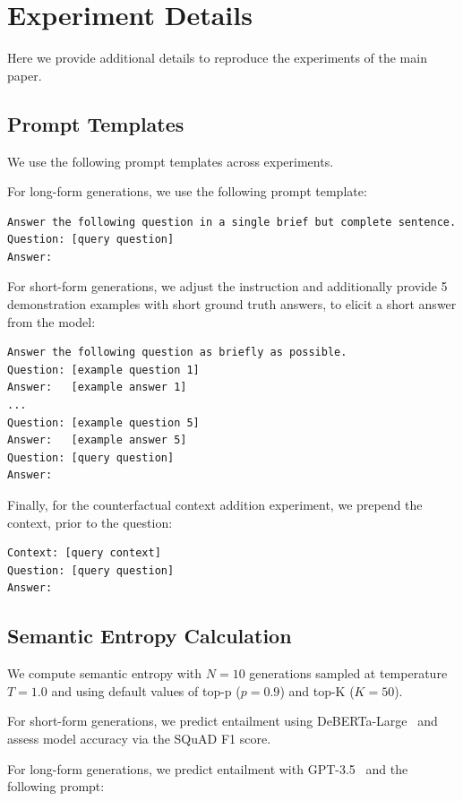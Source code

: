 \documentclass{article}
\begin{document}
\FloatBarrier
\section{Experiment Details}
\label{app:exp_details}

Here we provide additional details to reproduce the experiments of the main paper.

\subsection{Prompt Templates}
\label{app:prompt_format}
We use the following prompt templates across experiments.

For long-form generations, we use the following prompt template:
\begin{verbatim}
Answer the following question in a single brief but complete sentence.
Question: [query question]
Answer:
\end{verbatim}

For short-form generations, we adjust the instruction and additionally provide 5 demonstration examples with short ground truth answers, to elicit a short answer from the model:
\begin{verbatim}
Answer the following question as briefly as possible.
Question: [example question 1]
Answer:   [example answer 1]
...
Question: [example question 5]
Answer:   [example answer 5]
Question: [query question]
Answer:
\end{verbatim}

Finally, for the counterfactual context addition experiment, we prepend the context, prior to the question:
\begin{verbatim}
Context: [query context]
Question: [query question]
Answer:
\end{verbatim}

\subsection{Semantic Entropy Calculation}
We compute semantic entropy with $N=10$ generations sampled at temperature $T=1.0$ and using default values of top-p ($p=0.9$) and top-K ($K=50$).

For short-form generations, we predict entailment using DeBERTa-Large~\citep{he2021deberta} and assess model accuracy via the SQuAD F1 score.

For long-form generations, we predict entailment with GPT-3.5~\citep{brown2020language} and the following prompt:
\end{document}
